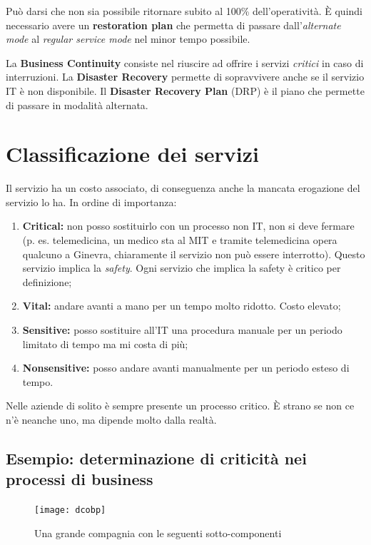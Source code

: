 Può darsi che non sia possibile ritornare subito al 100\% dell'operatività.
È quindi necessario avere un \textbf{restoration plan} che permetta di passare
dall'\textit{alternate mode} al \textit{regular service mode} nel minor tempo
possibile.

La \textbf{Business Continuity} consiste nel riuscire ad offrire i
servizi \emph{critici} in caso di interruzioni.
La \textbf{Disaster Recovery} permette di sopravvivere anche se il
servizio IT è non disponibile.
Il \textbf{Disaster Recovery Plan} (DRP) è il piano che permette di passare in
modalità alternata.

\section{Classificazione dei servizi}\label{sec:classificazioneServizi}

Il servizio ha un costo associato, di conseguenza anche la mancata erogazione
del servizio lo ha. In ordine di importanza:
\begin{enumerate}
 \item \textbf{Critical:} non posso sostituirlo con un processo non IT, non si
deve fermare (p. es. telemedicina, un medico sta al MIT e tramite telemedicina
opera qualcuno a Ginevra, chiaramente il servizio non può essere interrotto).
Questo servizio implica la \textit{safety}. Ogni servizio che
implica la safety è critico per definizione;
 \item \textbf{Vital:} andare avanti a mano per un tempo molto ridotto. Costo
elevato;
 \item \textbf{Sensitive:} posso sostituire all'IT una procedura manuale per un
periodo limitato di tempo ma mi costa di più;

 \item \textbf{Nonsensitive:} posso andare avanti manualmente per un periodo
esteso di tempo.

\end{enumerate}

Nelle aziende di solito è sempre presente un processo critico. È strano se non
ce n'è neanche uno, ma dipende molto dalla realtà.

\subsection{Esempio: determinazione di criticità nei processi di business}

\begin{figure}[H]
 \centering
 \texttt{[image: dcobp]}
 \caption{Una grande compagnia con le seguenti sotto-componenti}
\end{figure}

